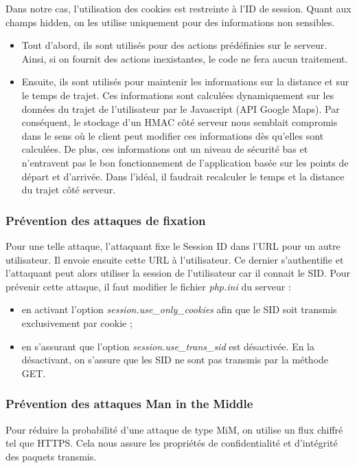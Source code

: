 \documentclass[a4paper]{article}
\begin{document}
Dans notre cas, l'utilisation des cookies est restreinte à l'ID de session.
Quant aux champs hidden, on les utilise uniquement pour des informations non
sensibles.
\begin{itemize}
	\item Tout d'abord, ils sont utilisés pour des actions prédéfinies sur le serveur. 
	Ainsi, si on fournit des actions inexistantes, le code ne fera aucun traitement.
	\item Ensuite, ils sont utilisés pour maintenir les informations sur la distance
	et sur le temps de trajet. Ces informations sont calculées dynamiquement sur les données
	du trajet de l'utilisateur par le Javascript (API Google Maps). Par conséquent, 
	le stockage d'un HMAC côté serveur nous semblait compromis dans le sens où le
	client peut modifier ces informations dès qu'elles sont calculées. 
	De plus, ces informations ont un niveau de sécurité bas et n'entravent pas
	le bon fonctionnement de l'application basée sur les points de départ et d'arrivée. 
	Dans l'idéal, il faudrait recalculer le temps et la distance du trajet côté serveur.
\end{itemize}

\subsubsection{Prévention des attaques de fixation}
Pour une telle attaque, l'attaquant fixe le Session ID dans l'URL pour
un autre utilisateur. Il envoie ensuite cette URL à l'utilisateur. Ce
dernier s'authentifie et l'attaquant peut alors utiliser la session de
l'utilisateur car il connait le SID. Pour prévenir cette attaque, il faut
modifier le fichier \textit{php.ini} du serveur :

\begin{itemize}
	\item en activant l'option \textit{session.use\_only\_cookies} afin que
		le SID soit transmis exclusivement par cookie ;
	\item en s'assurant que l'option \textit{session.use\_trans\_sid} est désactivée. 
	En la désactivant, on s'assure que les SID ne sont pas transmis par la méthode GET.
\end{itemize}

\subsubsection{Prévention des attaques Man in the Middle}
Pour réduire la probabilité d'une attaque de type MiM, on utilise un flux
chiffré tel que HTTPS. Cela nous assure les propriétés de confidentialité
et d'intégrité des paquets transmis.
\end{document}
